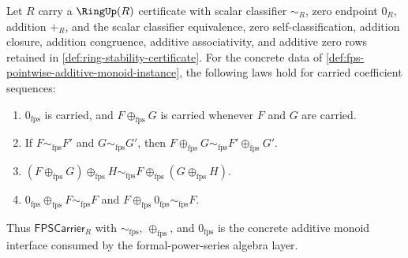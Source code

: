 \begin{theorem}
\label{thm:fps-pointwise-additive-monoid-laws}
Let $R$ carry a $\RingUp(R)$ certificate with scalar classifier $\sim_R$, zero endpoint $0_R$, addition $+_R$, and the scalar classifier equivalence, zero self-classification, addition closure, addition congruence, additive associativity, and additive zero rows retained in \autoref{def:ring-stability-certificate}. For the concrete data of \autoref{def:fps-pointwise-additive-monoid-instance}, the following laws hold for carried coefficient sequences:
\begin{enumerate}
  \item $0_{\mathrm{fps}}$ is carried, and $F\oplus_{\mathrm{fps}}G$ is carried whenever $F$ and $G$ are carried.
  \item If $F\sim_{\mathrm{fps}}F'$ and $G\sim_{\mathrm{fps}}G'$, then $F\oplus_{\mathrm{fps}}G\sim_{\mathrm{fps}}F'\oplus_{\mathrm{fps}}G'$.
  \item $(F\oplus_{\mathrm{fps}}G)\oplus_{\mathrm{fps}}H\sim_{\mathrm{fps}}F\oplus_{\mathrm{fps}}(G\oplus_{\mathrm{fps}}H)$.
  \item $0_{\mathrm{fps}}\oplus_{\mathrm{fps}}F\sim_{\mathrm{fps}}F$ and $F\oplus_{\mathrm{fps}}0_{\mathrm{fps}}\sim_{\mathrm{fps}}F$.
\end{enumerate}
Thus $\mathsf{FPSCarrier}_R$ with $\sim_{\mathrm{fps}}$, $\oplus_{\mathrm{fps}}$, and $0_{\mathrm{fps}}$ is the concrete additive monoid interface consumed by the formal-power-series algebra layer.
\end{theorem}
